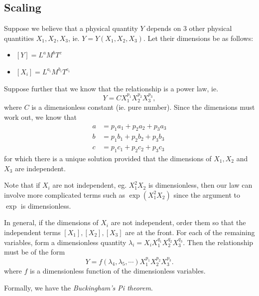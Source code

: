 \documentclass[a4paper]{article}
\begin{document}
\subsection{Scaling}
Suppose we believe that a physical quantity $Y$ depends on $3$ other physical quantities $X_1, X_2, X_3$, ie. $Y = Y(X_1, X_2, X_3)$. Let their dimensions be as follows:
\begin{itemize}
  \item $[Y] = L^aM^bT^c$
  \item $[X_i] = L^{a_i}M^{b_i}T^{c_i}$
\end{itemize}
Suppose further that we know that the relationship is a power law, ie. 
\[
  Y = CX_1^{p_1}X_2^{p_2}X_3^{p_3},
\]
where $C$ is a dimensionless constant (ie. pure number). Since the dimensions must work out, we know that
\begin{align*}
  a &= p_1a_1 + p_2a_2 + p_3a_3\\
  b &= p_1b_1 + p_2b_2 + p_3b_3\\
  c &= p_1c_1 + p_2c_2 + p_3c_3
\end{align*}
for which there is a unique solution provided that the dimensions of $X_1, X_2$ and $X_3$ are independent.

Note that if $X_i$ are not independent, eg. $X_1^2X_2$ is dimensionless, then our law can involve more complicated terms such as $\exp (X_1^2 X_2)$ since the argument to $\exp$ is dimensionless.

In general, if the dimensions of $X_i$ are not independent, order them so that the independent terms $[X_1], [X_2], [X_3]$ are at the front. For each of the remaining variables, form a dimensionless quantity $\lambda_i = X_iX_1^{q_1}X_2^{q_2}X_3^{q_3}$.
Then the relationship must be of the form
\[
  Y = f(\lambda_4, \lambda_5, \cdots) X_1^{p_1}X_2^{p_2}X_3^{p_3}.
\]
where $f$ is a dimensionless function of the dimensionless variables.

Formally, we have the \emph{Buckingham's Pi theorem}.
\end{document}
